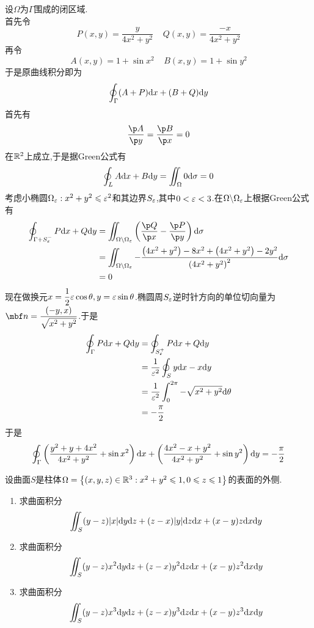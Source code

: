 \documentclass{ctexart}
\begin{document}
\begin{solution}
    设$\Omega$为$\Gamma$围成的闭区域.\\
    首先令
    \[P(x,y)=\dfrac{y}{4x^2+y^2}\ \ \ \ \ Q(x,y)=\dfrac{-x}{4x^2+y^2}\]
    再令
    \[A(x,y)=1+\sin x^2\ \ \ \ \ B(x,y)=1+\sin y^2\]
    于是原曲线积分即为
    \[\oint_{\Gamma}(A+P)\mathrm{d} x+(B+Q)\mathrm{d} y\]
    首先有
    \[\dfrac{\p A}{\p y}=\dfrac{\p B}{\p x}=0\]
    在$\mathbb{R}^2$上成立,于是据Green公式有
    \[\oint_{L}A\mathrm{d} x+B\mathrm{d} y=\iint_{\Omega}0\mathrm{d}\sigma=0\]
    考虑小椭圆$\Omega_\varepsilon:x^2+y^2\leqslant\varepsilon^2$和其边界$S_\varepsilon$,其中$0<\varepsilon<3$.在$\Omega\backslash\Omega_\varepsilon$上根据Green公式有
    \[\begin{aligned}
        \oint_{\Gamma+S_\ep^-}P\di x+Q\di y
        &= \iint_{\Omega\backslash\Omega_\ep}\left(\dfrac{\p Q}{\p x}-\dfrac{\p P}{\p y}\right)\di\sigma \\
        &= \iint_{\Omega\backslash\Omega_\ep}-\dfrac{\left(4x^2+y^2\right)-8x^2+\left(4x^2+y^2\right)-2y^2}{\left(4x^2+y^2\right)^2}\di\sigma \\
        &= 0
    \end{aligned}\]
    现在做换元$x=\dfrac12\varepsilon\cos\theta,y=\varepsilon\sin\theta$.椭圆周$S_\varepsilon$逆时针方向的单位切向量为$\mbf n=\dfrac{(-y,x)}{\sqrt{x^2+y^2}}$.于是
    \[\begin{aligned}
        \oint_{\Gamma}P\mathrm{d} x+Q\mathrm{d} y
        &= \oint_{S_\varepsilon^+}P\mathrm{d} x+Q\mathrm{d} y \\
        &= \dfrac{1}{\varepsilon^2}\oint_Sy\mathrm{d} x-x\mathrm{d} y \\
        &= \dfrac{1}{\varepsilon^2}\int_0^{2\pi}-\sqrt{x^2+y^2}\mathrm{d}\theta \\
        &= -\dfrac{\pi}{2}
    \end{aligned}\]
    于是
    \[\oint_{\Gamma}\left(\dfrac{y^2+y+4x^2}{4x^2+y^2}+\sin x^2\right)\mathrm{d} x+\left(\dfrac{4x^2-x+y^2}{4x^2+y^2}+\sin y^2\right)\mathrm{d} y=-\dfrac\pi2\]

\end{solution}
\begin{problem}[10.(10\songti{分})]
    设曲面$S$是柱体$\Omega=\left\{(x,y,z)\in\mathbb{R}^3:x^2+y^2\leqslant1,0\leqslant z\leqslant1\right\}$的表面的外侧.
    \begin{enumerate}[label=\tbf{(\arabic*)}]
        \item 求曲面积分
            \[\iint_S(y-z)|x|\mathrm{d} y\mathrm{d} z+(z-x)|y|\mathrm{d} z\mathrm{d} x+(x-y)z\mathrm{d} x\mathrm{d} y\]
        \item 求曲面积分
            \[\iint_S(y-z)x^2\mathrm{d} y\mathrm{d} z+(z-x)y^2\mathrm{d} z\mathrm{d} x+(x-y)z^2\mathrm{d} x\mathrm{d} y\]
        \item 求曲面积分
            \[\iint_S(y-z)x^3\mathrm{d} y\mathrm{d} z+(z-x)y^3\mathrm{d} z\mathrm{d} x+(x-y)z^3\mathrm{d} x\mathrm{d} y\]
    \end{enumerate}
\end{problem}
\end{document}

